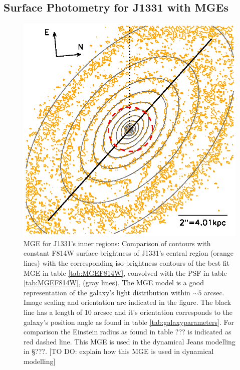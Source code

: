 \subsection{Surface Photometry for J1331 with MGEs} \label{sec:MGE_results}


\begin{figure}
\centering
\includegraphics[width=0.8\columnwidth]{fig/1331F814Wsci_MGE_M.ps}
\caption{MGE for J1331's inner regions: Comparison of contours with constant F814W surface brightness of J1331's central region (orange lines) with the corresponding iso-brightness contours of the best fit MGE in table \ref{tab:MGEF814W}, convolved with the PSF in table \ref{tab:MGEF814W}, (gray lines). The MGE model is a good representation of the galaxy's light distribution within $\sim 5$ arcsec. Image scaling and orientation are indicated in the figure. The black line has a length of 10 arcsec and it's orientation corresponds to the galaxy's position angle as found in table \ref{tab:galaxyparameters}. For comparison the Einstein radius as found in table ??? is indicated as red dashed line. This MGE is used in the dynamical Jeans modelling in \S ???. [TO DO: explain how this MGE is used in dynamical modelling]}
\label{fig:MGEinnerRegions}
\end{figure}

